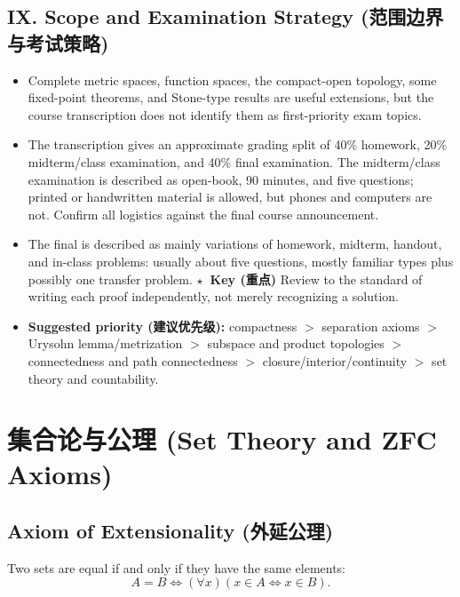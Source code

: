 \documentclass{article}
\newcommand{\reviewkey}{\textcolor{red!65!black}{\textbf{\ensuremath{\star}\ Key (重点)}}}
\begin{document}
\subsection*{IX. Scope and Examination Strategy (范围边界与考试策略)}

\begin{itemize}
  \item Complete metric spaces, function spaces, the compact-open topology,
  some fixed-point theorems, and Stone-type results are useful extensions, but
  the course transcription does not identify them as first-priority exam topics.
  \item The transcription gives an approximate grading split of 40\% homework,
  20\% midterm/class examination, and 40\% final examination. The midterm/class
  examination is described as open-book, 90 minutes, and five questions; printed
  or handwritten material is allowed, but phones and computers are not. Confirm
  all logistics against the final course announcement.
  \item The final is described as mainly variations of homework, midterm,
  handout, and in-class problems: usually about five questions, mostly familiar
  types plus possibly one transfer problem. \reviewkey{} Review to the standard
  of writing each proof independently, not merely recognizing a solution.
  \item \textbf{Suggested priority (建议优先级):} compactness $>$ separation
  axioms $>$ Urysohn lemma/metrization $>$ subspace and product topologies $>$
  connectedness and path connectedness $>$ closure/interior/continuity $>$ set
  theory and countability.
\end{itemize}

\newpage

\section{集合论与公理 (Set Theory and ZFC Axioms)}

\subsection{Axiom of Extensionality (外延公理)}\label{def:extensionality}
Two sets are equal if and only if they have the same elements:
\[
  A = B \iff (\forall x)(x \in A \Leftrightarrow x \in B).
\]
\end{document}
